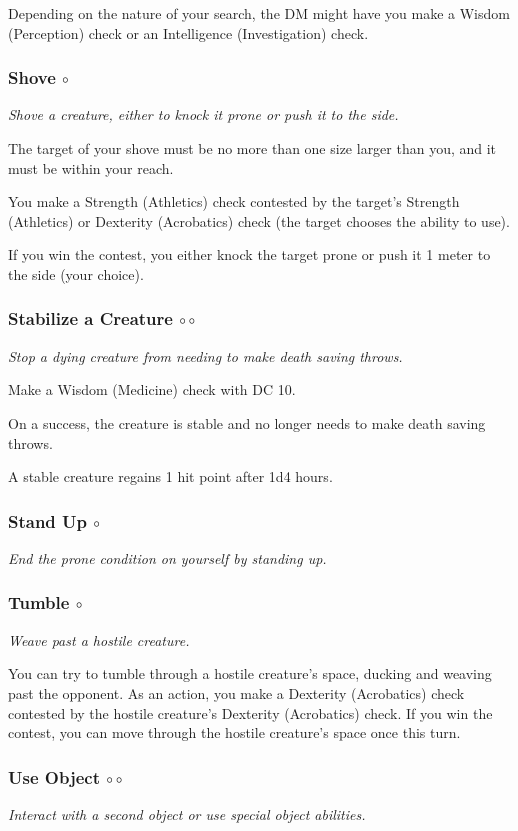     Depending on the nature of your search, the DM might have you make a Wisdom (Perception) check or an Intelligence (Investigation) check.
\subsubsection{Shove $\circ$} \label{act::shove}
    \textit{Shove a creature, either to knock it prone or push it to the side.}

    The target of your shove must be no more than one size larger than you, and it must be within your reach.

    You make a Strength (Athletics) check contested by the target's Strength (Athletics) or Dexterity (Acrobatics) check (the target chooses the ability to use).

    If you win the contest, you either knock the target prone or push it 1 meter to the side (your choice).
\subsubsection{Stabilize a Creature $\circ\circ$} \label{act::stabilizeacreature}
    \textit{Stop a dying creature from needing to make death saving throws.}

    Make a Wisdom (Medicine) check with DC 10.

    On a success, the creature is stable and no longer needs to make death saving throws.

    A stable creature regains 1 hit point after 1d4 hours.
\subsubsection{Stand Up $\circ$} \label{act::standup}
    \textit{End the prone condition on yourself by standing up.}
\subsubsection{Tumble $\circ$} \label{act::tumble}
    \textit{Weave past a hostile creature.}

    You can try to tumble through a hostile creature's space, ducking and weaving past the opponent.
    As an action, you make a Dexterity (Acrobatics) check contested by the hostile creature's Dexterity (Acrobatics) check.
    If you win the contest, you can move through the hostile creature's space once this turn.
\subsubsection{Use Object $\circ\circ$} \label{act::useobject}
    \textit{Interact with a second object or use special object abilities.}

